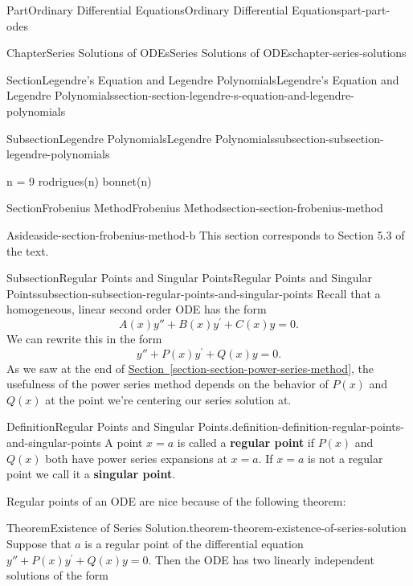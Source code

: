 \documentclass[twoside,10pt,]{book}
\newcommand{\xreffont}{\relax}
\newcommand{\terminology}[1]{\textbf{#1}}
\numberwithin{equation}{part}
\begin{document}
\begin{partptx}{Part}{Ordinary Differential Equations}{}{Ordinary Differential Equations}{}{}{part-part-odes}
\begin{chapterptx}{Chapter}{Series Solutions of ODEs}{}{Series Solutions of ODEs}{}{}{chapter-series-solutions}
\begin{sectionptx}{Section}{Legendre's Equation and Legendre Polynomials}{}{Legendre's Equation and Legendre Polynomials}{}{}{section-section-legendre-s-equation-and-legendre-polynomials}
\begin{subsectionptx}{Subsection}{Legendre Polynomials}{}{Legendre Polynomials}{}{}{subsection-subsection-legendre-polynomials}
\begin{sageinput}
n = 9
rodrigues(n)
bonnet(n)
\end{sageinput}
\end{subsectionptx}
\end{sectionptx}
%
%
\typeout{************************************************}
\typeout{************************************************}
%
\begin{sectionptx}{Section}{Frobenius Method}{}{Frobenius Method}{}{}{section-section-frobenius-method}
\begin{aside}{Aside}{}{aside-section-frobenius-method-b}%
This section corresponds to Section 5.3 of the text.%
\end{aside}
%
%
\typeout{************************************************}
\typeout{************************************************}
%
\begin{subsectionptx}{Subsection}{Regular Points and Singular Points}{}{Regular Points and Singular Points}{}{}{subsection-subsection-regular-points-and-singular-points}
Recall that a homogeneous, linear second order ODE has the form%
\begin{equation*}
A(x)y''+B(x)y^\prime+C(x)y = 0.
\end{equation*}
We can rewrite this in the form%
\begin{equation*}
y''+P(x)y^\prime+Q(x)y = 0.
\end{equation*}
As we saw at the end of \hyperref[section-section-power-series-method]{Section~{\xreffont\ref{section-section-power-series-method}}}, the usefulness of the power series method depends on the behavior of \(P(x)\) and \(Q(x)\) at the point we're centering our series solution at.%
\begin{definition}{Definition}{Regular Points and Singular Points.}{definition-definition-regular-points-and-singular-points}%
%
A point \(x=a\) is called a \terminology{regular point} if \(P(x)\) and \(Q(x)\) both have power series expansions at \(x=a\). If \(x=a\) is not a regular point we call it a \terminology{singular point}.%
\end{definition}
Regular points of an ODE are nice because of the following theorem:%
\begin{theorem}{Theorem}{Existence of Series Solution.}{}{theorem-theorem-existence-of-series-solution}%
%
Suppose that \(a\) is a regular point of the differential equation \(y''+P(x)y^\prime+Q(x)y=0\). Then the ODE has two linearly independent solutions of the form%

\end{theorem}
\end{subsectionptx}
\end{sectionptx}
\end{chapterptx}
\end{partptx}
\end{document}
